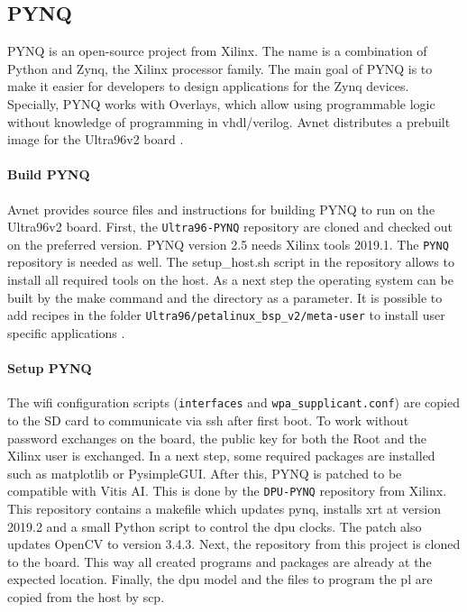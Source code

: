 \subsection{PYNQ}
\label{subsec:embedded_platform:operating_systems:pynq}

PYNQ is an open-source project from Xilinx.
The name is a combination of Python and Zynq, the Xilinx processor family.
The main goal of PYNQ is to make it easier for developers to design applications for the Zynq devices. 
Specially, PYNQ works with Overlays, which allow using programmable logic without knowledge of programming in vhdl/verilog.
Avnet distributes a prebuilt image for the Ultra96v2 board \cite{pynq_intro}.

\paragraph{Build PYNQ}
Avnet provides source files and instructions for building PYNQ to run on the Ultra96v2 board.
First, the \texttt{Ultra96-PYNQ} repository are cloned and checked out on the preferred version.
PYNQ version 2.5 needs Xilinx tools 2019.1.
The \texttt{PYNQ} repository is needed as well.
The setup\_host.sh script in the repository allows to install all required tools on the host.
As a next step the operating system can be built by the make command and the directory as a parameter.
It is possible to add recipes in the folder \texttt{Ultra96/petalinux\_bsp\_v2/meta-user} to install user specific applications \cite{avnet_pynq_github}. 

\paragraph{Setup PYNQ}
The wifi configuration scripts (\texttt{interfaces} and \texttt{wpa\_supplicant.conf}) are copied to the SD card to communicate via \acrfull{ssh} after first boot.
To work without password exchanges on the board, the public key for both the Root and the Xilinx user is exchanged.
In a next step, some required packages are installed such as matplotlib or PysimpleGUI.
After this, PYNQ is patched to be compatible with Vitis AI.
This is done by the \texttt{DPU-PYNQ} repository from Xilinx.
This repository contains a makefile which updates pynq, installs \acrfull{xrt} at version 2019.2 and a small Python script to control the \acrfull{dpu} clocks.
The patch also updates OpenCV to version 3.4.3.
Next, the repository from this project is cloned to the board.
This way all created programs and packages are already at the expected location.
Finally, the \acrshort{dpu} model and the files to program the \acrfull{pl} are copied from the host by \acrfull{scp}.

